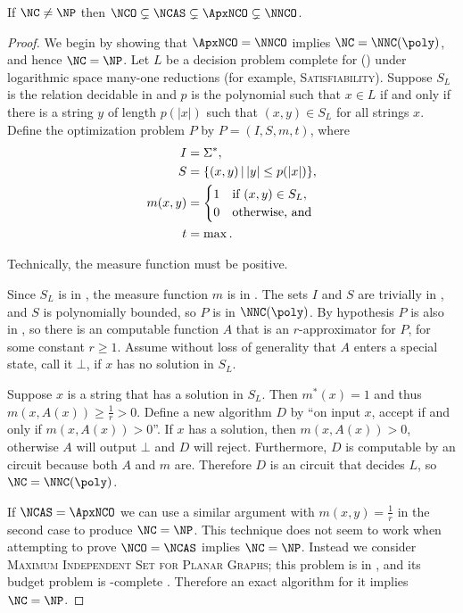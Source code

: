 \documentclass[]{article}
\let\originalleft\left
\let\originalright\right
\renewcommand{\left}{\mathopen{}\mathclose\bgroup\originalleft}
\renewcommand{\right}{\aftergroup\egroup\originalright}
\begin{document}
\begin{theorem}\label{thm:hierarchy}
  If $\NC \neq \NP$ then $\NCO \subsetneq \NCAS \subsetneq \ApxNCO \subsetneq \NNCO$.
\end{theorem}

\begin{proof}
  We begin by showing that $\ApxNCO = \NNCO$ implies $\NC = \NNC(\poly)$, and hence $\NC = \NP$.
  Let $L$ be a decision problem complete for \NNC(\poly) under logarithmic space many-one reductions (for example, \textsc{Satisfiability}).
  Suppose $S_L$ is the relation decidable in \NC{} and $p$ is the polynomial such that $x \in L$ if and only if there is a string $y$ of length $p(|x|)$ such that $(x, y) \in S_L$ for all strings $x$.
  Define the optimization problem $P$ by $P = (I, S, m, t)$, where
  \begin{align*}
    I & = \Sigma^*, \\
    S & = \left\{ (x, y) \,\middle|\, |y| \leq p(|x|) \right\}, \\
    m(x, y) & =
    \begin{cases}
      1 & \text{if } (x, y) \in S_L, \\
      0 & \text{otherwise, and}
    \end{cases} \\
    t & = \max.
  \end{align*}
  \begin{todo}
    Technically, the measure function must be positive.
  \end{todo}
  Since $S_L$ is in \NC, the measure function $m$ is in \FNC.
  The sets $I$ and $S$ are trivially in \NC, and $S$ is polynomially bounded, so $P$ is in $\NNC(\poly)$.
  By hypothesis $P$ is also in \ApxNCO, so there is an \NC{} computable function $A$ that is an $r$-approximator for $P$, for some constant $r \geq 1$.
  Assume without loss of generality that $A$ enters a special state, call it $\bot$, if $x$ has no solution in $S_L$.

  Suppose $x$ is a string that has a solution in $S_L$.
  Then $m^*(x) = 1$ and thus $m(x, A(x)) \geq \frac{1}{r} > 0$.
  Define a new algorithm $D$ by ``on input $x$, accept if and only if $m(x, A(x)) > 0$''.
  If $x$ has a solution, then $m(x, A(x)) > 0$, otherwise $A$ will output $\bot$ and $D$ will reject.
  Furthermore, $D$ is computable by an \NC{} circuit because both $A$ and $m$ are.
  Therefore $D$ is an \NC circuit that decides $L$, so $\NC = \NNC(\poly)$.

  If $\NCAS = \ApxNCO$ we can use a similar argument with $m(x, y) = \frac{1}{r}$ in the second case to produce $\NC = \NP$.
  This technique does not seem to work when attempting to prove $\NCO = \NCAS$ implies $\NC = \NP$.
  Instead we consider \textsc{Maximum Independent Set for Planar Graphs}; this problem is in \NCAS{} \cite[Theorem~5.2.1]{dsst97}, and its budget problem is \NP-complete \cite{gj79}.
  Therefore an exact \NC{} algorithm for it implies $\NC = \NP$.
\end{proof}
\end{document}
